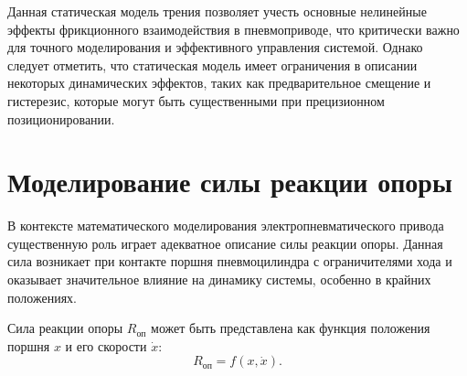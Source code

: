 



Данная статическая модель трения позволяет учесть основные нелинейные
эффекты фрикционного взаимодействия в пневмоприводе, что критически важно для
точного моделирования и эффективного управления системой. Однако следует отметить, что
статическая модель имеет ограничения в описании некоторых динамических эффектов, таких
как предварительное смещение и гистерезис, которые могут быть
существенными при прецизионном позиционировании.


\section{Моделирование силы реакции опоры}\label{sec:ch2/sec2/subsec5}

В контексте математического моделирования электропневматического привода существенную роль играет
адекватное описание силы реакции опоры. Данная сила возникает при контакте поршня пневмоцилиндра
с ограничителями хода и оказывает значительное влияние на динамику системы, особенно в крайних положениях.

Сила реакции опоры $R_\text{оп}$ может быть представлена как функция положения поршня $x$ и его скорости $\dot{x}$:
\begin{equation*}
    R_\text{оп} = f(x, \dot{x}).
\end{equation*}

